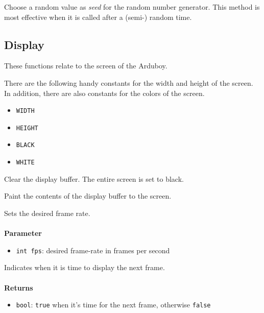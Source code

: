 \documentclass[11pt,fleqn]{book} %
\begin{document}
\begin{libf}[initRandomSeed()]
    Choose a random value as \emph{seed} for the random number generator. This method is most effective when it is called after a (semi-) random time.
\end{libf}

\subsection{Display}
These functions relate to the screen of the Arduboy.

\begin{libf}
	There are the following handy constants for the width and height of the screen. In addition, there are also constants for the colors of the screen.
	\begin{multicols}{2}
		\begin{itemize}
			\item \texttt{WIDTH}
			\item \texttt{HEIGHT}
			\item \texttt{BLACK}
			\item \texttt{WHITE}
		\end{itemize}
	\end{multicols}
\end{libf}

\begin{libf}[clear()]
	Clear the display buffer. The entire screen is set to black.
\end{libf}

\begin{libf}[display()]
	Paint the contents of the display buffer to the screen.
\end{libf}

\begin{libf}
	Sets the desired frame rate.\\ \\
	\textbf{Parameter}
	\begin{itemize}
		\item \texttt{int fps}: desired frame-rate in frames per second
	\end{itemize}
\end{libf}

\begin{libf}[nextFrame()]
	Indicates when it is time to display the next frame.\\ \\
	\textbf{Returns}
	\begin{itemize}
		\item \texttt{bool}: \texttt{true} when it's time for the next frame, otherwise \texttt{false}
	\end{itemize}
\end{libf}
\end{document}
